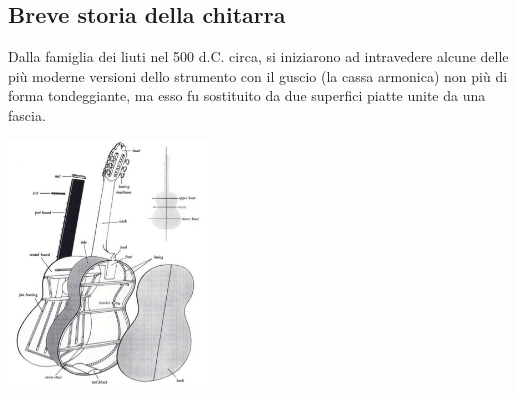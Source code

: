 \documentclass[oneside]{article}
\begin{document}
\begin{multicols*}{2}

\section{ Breve storia della chitarra}

Dalla famiglia dei liuti nel 500 d.C. circa, si iniziarono ad intravedere alcune delle più moderne versioni dello strumento con il guscio (la cassa armonica) non più di forma tondeggiante, ma esso fu sostituito da due superfici piatte unite da una fascia.

\includegraphics[width=0.4\textwidth]{img/chit_spaccato.png}


\end{multicols*}
\end{document}

